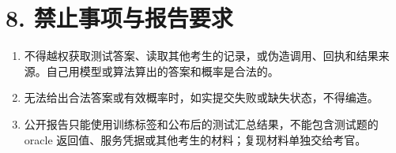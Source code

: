 \documentclass[11pt,a4paper]{article}
\providecommand{\tightlist}{\setlength{\itemsep}{3pt}\setlength{\parskip}{0pt}}
\begin{document}
\section{8.
禁止事项与报告要求}\label{ux7981ux6b62ux4e8bux9879ux4e0eux62a5ux544aux8981ux6c42}

\begin{enumerate}
\def\labelenumi{\arabic{enumi}.}
\tightlist
\item
  不得越权获取测试答案、读取其他考生的记录，或伪造调用、回执和结果来源。自己用模型或算法算出的答案和概率是合法的。
\item
  无法给出合法答案或有效概率时，如实提交失败或缺失状态，不得编造。
\item
  公开报告只能使用训练标签和公布后的测试汇总结果，不能包含测试题的
  oracle 返回值、服务凭据或其他考生的材料；复现材料单独交给考官。
\end{enumerate}
\end{document}

